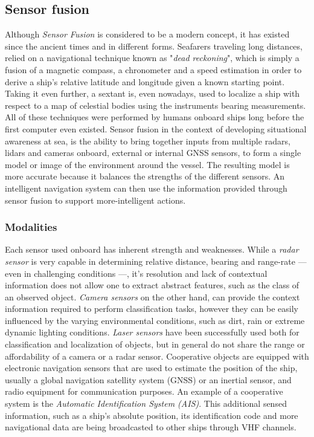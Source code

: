 \subsection{Sensor fusion}
Although \emph{Sensor Fusion} is considered to be a modern concept, it has existed since the ancient times and in different forms. Seafarers traveling long distances, relied on a navigational technique known as "\emph{dead reckoning}", which is simply a fusion of a magnetic compass, a chronometer and a speed estimation in order to derive a ship's relative latitude and longitude given a known starting point. Taking it even further, a sextant is, even nowadays, used to localize a ship with respect to a map of celestial bodies using the instruments bearing measurements. All of these techniques were performed by humans onboard ships long before the first computer even existed. Sensor fusion in the context of developing situational awareness at sea, is the ability to bring together inputs from multiple radars, lidars and cameras onboard, external or internal GNSS sensors, to form a single model or image of the environment around the vessel. The resulting model is more accurate because it balances the strengths of the different sensors. An intelligent navigation system can then use the information provided through sensor fusion to support more-intelligent actions.
\subsubsection{Modalities}
Each sensor used onboard has inherent strength and weaknesses.  While a \emph{radar sensor} is very capable in determining relative distance, bearing and range-rate --- even in challenging conditions ---, it's resolution and lack of contextual information does not allow one to extract abstract features, such as the class of an observed object. \emph{Camera sensors} on the other hand, can provide the context information required to perform classification tasks, however they can be easily influenced by the varying environmental conditions, such as dirt, rain or extreme dynamic lighting conditions. \emph{Laser sensors} have been successfully used both for classification and localization of objects, but in general do not share the range or affordability of a camera or a radar sensor. Cooperative objects are equipped with electronic navigation sensors that are used to estimate the position of the ship, usually a global navigation satellity system (GNSS) or an inertial sensor, and radio equipment for communication purposes. An example of a cooperative system is the \emph{Automatic Identification System (AIS)}. This additional sensed information, such as a ship's absolute position, its identification code and more navigational data are being broadcasted to other ships through VHF channels.

